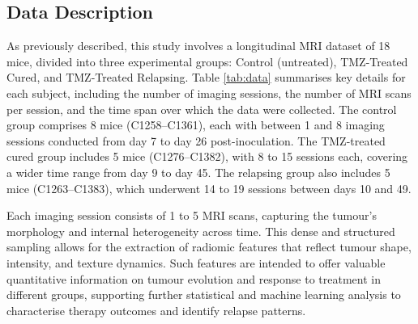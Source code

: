 \documentclass[12pt, a4paper]{report}
\begin{document}
\subsection{Data Description}

As previously described, this study involves a longitudinal MRI dataset of 18 mice, divided into three experimental groups: Control (untreated), TMZ-Treated Cured, and TMZ-Treated Relapsing. Table \ref{tab:data} summarises key details for each subject, including the number of imaging sessions, the number of MRI scans per session, and the time span over which the data were collected. The control group comprises 8 mice (C1258–C1361), each with between 1 and 8 imaging sessions conducted from day 7 to day 26 post-inoculation. The TMZ-treated cured group includes 5 mice (C1276–C1382), with 8 to 15 sessions each, covering a wider time range from day 9 to day 45. The relapsing group also includes 5 mice (C1263–C1383), which underwent 14 to 19 sessions between days 10 and 49.

Each imaging session consists of 1 to 5 MRI scans, capturing the tumour’s morphology and internal heterogeneity across time. This dense and structured sampling allows for the extraction of radiomic features that reflect tumour shape, intensity, and texture dynamics. Such features are intended to offer valuable quantitative information on tumour evolution and response to treatment in different groups, supporting further statistical and machine learning analysis to characterise therapy outcomes and identify relapse patterns.
\end{document}
